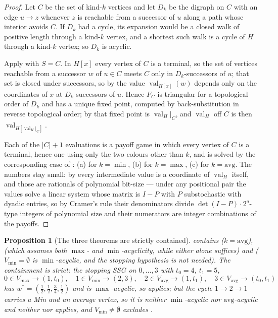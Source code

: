 \documentclass[11pt]{article}
\theoremstyle{plain}
\newtheorem{proposition}[theorem]{Proposition}
\theoremstyle{definition}
\DeclareMathOperator{\val}{val}
\newcommand{\Vmax}{V_{\max}}
\newcommand{\Vmin}{V_{\min}}
\newcommand{\Vavg}{V_{\mathrm{avg}}}
\begin{document}
\begin{proof}
Let $C$ be the set of kind-$k$ vertices and let $D_k$ be the digraph on
$C$ with an edge $u\to z$ whenever $z$ is reachable from a successor of
$u$ along a path whose interior avoids $C$. If $D_k$ had a cycle, its
expansion would be a closed walk of positive length through a kind-$k$
vertex, and a shortest such walk is a cycle of $H$ through a kind-$k$
vertex; so $D_k$ is acyclic.

Apply  with $S=C$. In $H[x]$ every vertex of $C$ is a
terminal, so the set of vertices reachable from a successor $w$ of
$u\in C$ meets $C$ only in $D_k$-successors of $u$; that set is closed
under successors, so by  the value
$\val_{H[x]}(w)$ depends only on the coordinates of $x$ at
$D_k$-successors of $u$. Hence $F_C$ is triangular for a topological order
of $D_k$ and has a unique fixed point, computed by back-substitution in
reverse topological order; by  that fixed point is
$\val_H|_C$, and $\val_H$ off $C$ is then $\val_{H[\val_H|_C]}$.

Each of the $|C|+1$ evaluations is a payoff game in which every vertex of
$C$ is a terminal, hence one using only the two colours other than $k$,
and is solved by the corresponding case of : (a) for
$k=\min$, (b) for $k=\max$, (c) for $k=\mathrm{avg}$. The numbers stay
small: by  every intermediate value is a coordinate of
$\val_H$ itself, and those are rationals of polynomial bit-size --- under
any positional pair the values solve a linear system whose matrix is
$I-P$ with $P$ substochastic with dyadic entries, so by Cramer's rule
their denominators divide $\det(I-P)\cdot2^{a}$-type integers of
polynomial size and their numerators are integer combinations of the
payoffs.
\end{proof}

\begin{proposition}[The three theorems are strictly
contained]\label{prop:kacyclic-strict}
 contains  ($k=\mathrm{avg}$),
 (which assumes both $\max$- and $\min$-acyclicity,
while either alone suffices) and  ($\Vmin=\emptyset$
is $\min$-acyclic, and the stopping hypothesis is not needed). The
containment is strict: the stopping SSG on $0,\dots,3$ with $t_0=4$,
$t_1=5$,
\[
  0\in\Vmax\to(1,t_0),\quad 1\in\Vmin\to(2,3),\quad
  2\in\Vavg\to(1,t_1),\quad 3\in\Vavg\to(t_0,t_1)
\]
has $w^\ast=(\tfrac12,\tfrac12,\tfrac34,\tfrac12)$ and is $\max$-acyclic,
so  applies; but the cycle $1\to2\to1$ carries a Min
and an average vertex, so it is neither $\min$-acyclic nor
$\mathrm{avg}$-acyclic and neither  nor
 applies, and $\Vmin\ne\emptyset$ excludes
.
\end{proposition}
\end{document}
